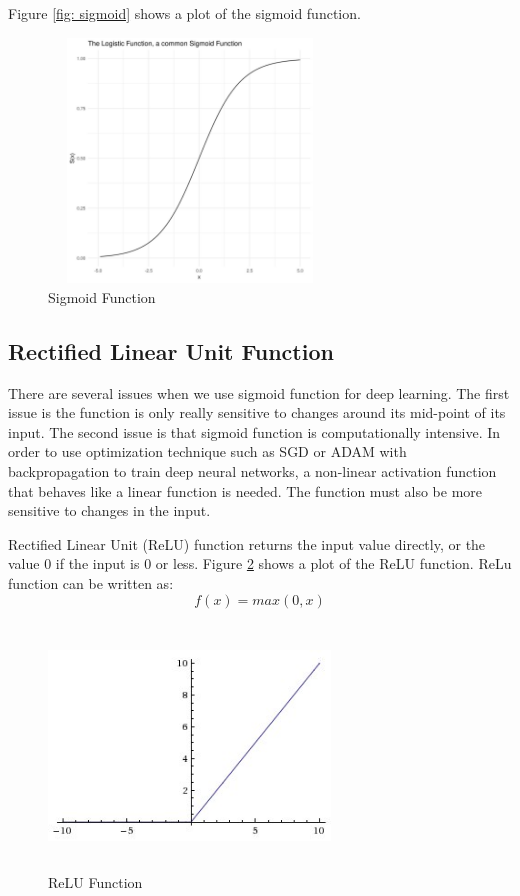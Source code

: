 Figure \ref{fig: sigmoid} shows a plot of the sigmoid function.
\FloatBarrier
\begin{figure}[ht]
\includegraphics[width=7.5cm, height=6.5cm]{images/sigmoid.jpg}
\centering
\caption{Sigmoid Function}
\label{fig:sigmoid}
\end{figure}
\FloatBarrier


\subsection{Rectified Linear Unit Function}

There are several issues when we use sigmoid function for deep learning. The first issue is the function is only really sensitive to changes around its mid-point of its input. The second issue is that sigmoid function is computationally intensive. In order to use optimization technique such as SGD or ADAM with backpropagation to train deep neural networks, a non-linear activation function that behaves like a linear function is needed. The function must also be more sensitive to changes in the input.

Rectified Linear Unit (ReLU) function returns the input value directly, or the value 0 if the input is 0 or less. Figure \ref{fig:relu} shows a plot of the ReLU function. ReLu function can be written as:
\begin{equation}
    f(x) = max(0,x)
\end{equation}

\begin{figure}[ht]
\includegraphics[width=7.5cm, height=6.5cm]{images/relu.jpeg}
\centering
\caption{ReLU Function}
\label{fig:relu}
\end{figure}
\FloatBarrier

